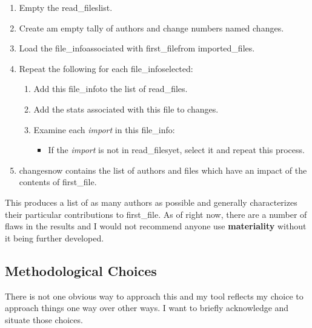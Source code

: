 \documentclass[a4paper,man,natbib,floatsintext]{apa6}
\begin{document}
\begin{enumerate}
\begin{enumerate}
\begin{enumerate}
\begin{itemize}
        \end{itemize}
      \end{enumerate}      
    \end{enumerate}
    \item Empty the \textlangle read\_files\textrangle list. 
    \item Create am empty tally of authors and change numbers named \textlangle changes\textrangle.
    \item Load the \textlangle file\_info\textrangle associated with \textlangle first\_file\textrangle from \textlangle imported\_files\textrangle.
    \item Repeat the following for each \textlangle file\_info\textrangle selected:
    \begin{enumerate}
      \item Add this \textlangle file\_info\textrangle to the list of \textlangle read\_files\textrangle.
      \item Add the stats associated with this file to \textlangle changes\textrangle.
      \item Examine each \textit{import} in this \textlangle file\_info\textrangle:
      \begin{itemize}
        \item If the \textit{import} is not in \textlangle read\_files\textrangle yet, select it and repeat this process.
      \end{itemize}
    \end{enumerate}
    \item \textlangle changes\textrangle now contains the list of authors and files which have an impact of the contents of \textlangle first\_file\textrangle.
  \end{enumerate}

  This produces a list of as many authors as possible and generally characterizes their particular contributions to \textlangle first\_file\textrangle. As of right now, there are a number of flaws in the results and I would not recommend anyone use \textbf{materiality} without it being further developed\footnotemark. 
  \doublespace


  \subsection{Methodological Choices}
  There is not one obvious way to approach this and my tool reflects my choice to approach things one way over other ways. I want to briefly acknowledge and situate those choices.
\end{document}
